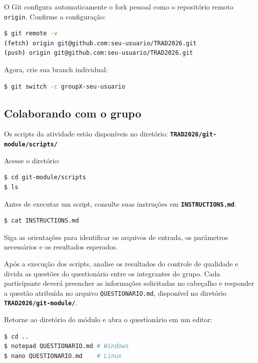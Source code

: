 \documentclass[12pt,a4paper]{article}
\begin{document}
O Git configura automaticamente o fork pessoal como o repositório remoto \texttt{origin}. Confirme a configuração: 

\begin{lstlisting}[language=bash]
$ git remote -v
(fetch) origin git@github.com:seu-usuario/TRAD2026.git
(push) origin git@github.com:seu-usuario/TRAD2026.git
\end{lstlisting}

Agora, crie sua branch individual:

\begin{lstlisting}[language=bash]
$ git switch -c groupX-seu-usuario
\end{lstlisting} 

\subsection{Colaborando com o grupo}

Os scripts da atividade estão disponíveis no diretório: \textbf{\texttt{TRAD2026/git-module/scripts/}}

Acesse o diretório:

\begin{lstlisting}[language=bash]
$ cd git-module/scripts
$ ls 
\end{lstlisting}

Antes de executar um script, consulte suas instruções em \textbf{\texttt{INSTRUCTIONS.md}}.

\begin{lstlisting}[language=bash]
$ cat INSTRUCTIONS.md
\end{lstlisting}

Siga as orientações para identificar os arquivos de entrada, os parâmetros necessários e os resultados esperados.

Após a execução dos scripts, analise os resultados do controle de qualidade e divida as questões do questionário entre os integrantes do grupo. Cada participante deverá preencher as informações solicitadas no cabeçalho e responder a questão atribuída no arquivo {\texttt{QUESTIONARIO.md}}, disponível no diretório \textbf{\texttt{TRAD2026/git-module/}}.

Retorne ao diretório do módulo e abra o questionário em um editor:

\begin{lstlisting}[language=bash]
$ cd ..
$ notepad QUESTIONARIO.md # Windows
$ nano QUESTIONARIO.md    # Linux
\end{lstlisting}
\end{document}
